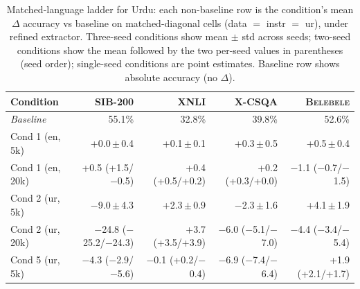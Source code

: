 \begin{table}[t]
  \centering
  \small
  \begin{tabular}{lrrrr}
    \toprule
    Condition & \textsc{SIB-200} & \textsc{XNLI} & \textsc{X-CSQA} & \textsc{Belebele} \\
    \midrule
    \textit{Baseline} & 55.1\% & 32.8\% & 39.8\% & 52.6\% \\
    Cond 1 (en, 5k) & +0.0\,$\pm$\,0.4 & +0.1\,$\pm$\,0.1 & +0.3\,$\pm$\,0.5 & +0.5\,$\pm$\,0.4 \\
    Cond 1 (en, 20k) & +0.5 (+1.5/$-$0.5) & +0.4 (+0.5/+0.2) & +0.2 (+0.3/+0.0) & $-$1.1 ($-$0.7/$-$1.5) \\
    Cond 2 (ur, 5k) & $-$9.0\,$\pm$\,4.3 & +2.3\,$\pm$\,0.9 & $-$2.3\,$\pm$\,1.6 & +4.1\,$\pm$\,1.9 \\
    Cond 2 (ur, 20k) & $-$24.8 ($-$25.2/$-$24.3) & +3.7 (+3.5/+3.9) & $-$6.0 ($-$5.1/$-$7.0) & $-$4.4 ($-$3.4/$-$5.4) \\
    Cond 5 (ur, 5k) & $-$4.3 ($-$2.9/$-$5.6) & $-$0.1 (+0.2/$-$0.4) & $-$6.9 ($-$7.4/$-$6.4) & +1.9 (+2.1/+1.7) \\
    \bottomrule
  \end{tabular}
  \caption{Matched-language ladder for Urdu: each non-baseline row is the condition's mean $\Delta$ accuracy vs baseline on matched-diagonal cells (data $=$ instr $=$ ur), under refined extractor. Three-seed conditions show mean $\pm$ std across seeds; two-seed conditions show the mean followed by the two per-seed values in parentheses (seed order); single-seed conditions are point estimates. Baseline row shows absolute accuracy (no $\Delta$).}
  \label{tab:matched-ladder-ur}
\end{table}


